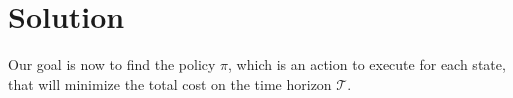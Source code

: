 \section{Solution}
\label{sec:solution}

Our goal is now to find the policy $\pi$, which is an action to execute for each state, that will minimize the total cost on the time horizon $\mathcal{T}$.
 
